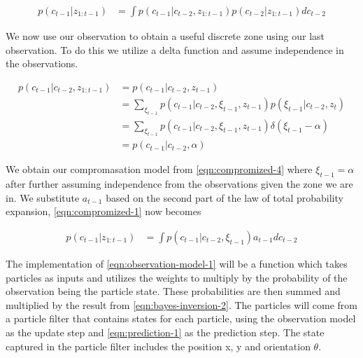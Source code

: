 \documentclass{article}
\begin{document}
\begin{align}
  p(c_{t-1}| z_{1:t-1})
  &= 
  \int 
  p(c_{t-1}|c_{t-2}, z_{1:t-1})
  p(c_{t-2}|z_{1:t-1})
  dc_{t-2}
  \label{eqn:compromized-1}  
\end{align}

We now use our observation to obtain a useful discrete zone using our last observation. To do this we utilize a delta function and assume independence in the observations. 

\begin{align}
  p(c_{t-1}|c_{t-2}, z_{1:t-1})
  &= 
  p(c_{t-1}|c_{t-2}, z_{t-1})                          \\
  &= 
  \sum_{\xi_{t-1}}
  p(c_{t-1}|c_{t-2}, \xi_{t-1}, z_{t-1})
  p(\xi_{t-1}|c_{t-2}, z_{t})
  \label{eqn:compromized-2}                            \\
  &= 
  \sum_{\xi_{t-1}}
  p(c_{t-1}|c_{t-2}, \xi_{t-1}, z_{t-1})
  \delta(\xi_{t-1}-\alpha)
  \label{eqn:compromized-3}                            \\
  &= 
  p(c_{t-1}|c_{t-2}, \alpha)
  \label{eqn:compromized-4} 
\end{align}

We obtain our compromasation model from \eqref{eqn:compromized-4} where $\xi_{t-1} = \alpha$ after further assuming independence from the observations given the zone we are in. We substitute $a_{t-1}$ based on the second part of the law of total probability expansion, \eqref{eqn:compromized-1} now becomes

\begin{align}
  p(c_{t-1}| z_{1:t-1})
  &= 
  \int 
  p(c_{t-1}|c_{t-2}, \xi_{t-1})
  a_{t-1}
  dc_{t-2}
  \label{eqn:compromized-5}  
\end{align}

The implementation of \eqref{eqn:observation-model-1} will be a function which takes particles as inputs and utilizes the weights to multiply by the probability of the observation being the particle state. These probabilities are then summed and multiplied by the result from \eqref{eqn:bayes-inversion-2}. The particles will come from a particle filter that contains states for each particle, using the observation model as the update step and \eqref{eqn:prediction-1} as the prediction step. The state captured in the particle filter includes the position x, y and orientation $\theta$.
\end{document}
